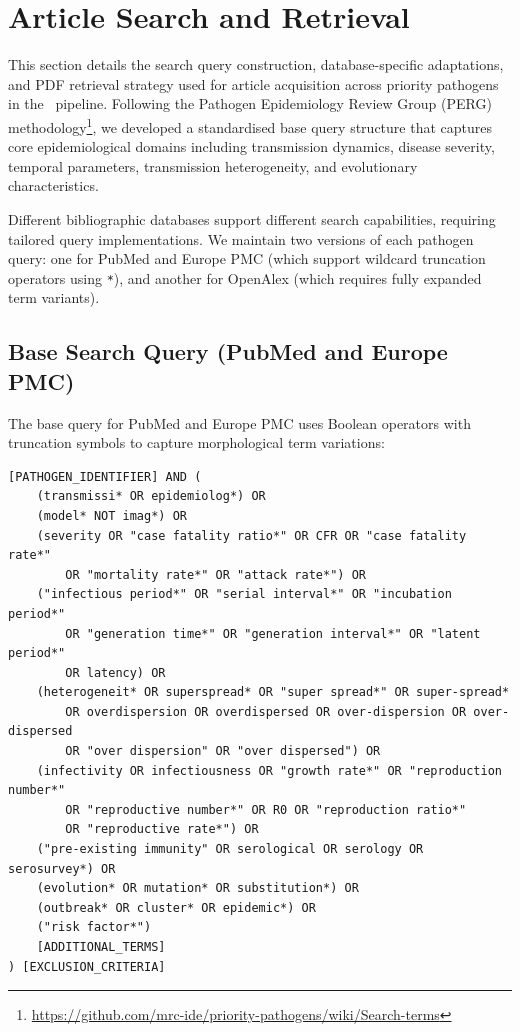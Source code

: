 \section{Article Search and Retrieval}\label{app:search_queries}

This section details the search query construction, database-specific adaptations, and PDF retrieval strategy used for article acquisition across priority pathogens in the \name~pipeline. Following the Pathogen Epidemiology Review Group (PERG) methodology\footnote{\url{https://github.com/mrc-ide/priority-pathogens/wiki/Search-terms}}, we developed a standardised base query structure that captures core epidemiological domains including transmission dynamics, disease severity, temporal parameters, transmission heterogeneity, and evolutionary characteristics.

Different bibliographic databases support different search capabilities, requiring tailored query implementations. We maintain two versions of each pathogen query: one for PubMed and Europe PMC (which support wildcard truncation operators using \texttt{*}), and another for OpenAlex (which requires fully expanded term variants).

\subsection{Base Search Query (PubMed and Europe PMC)}

The base query for PubMed and Europe PMC uses Boolean operators with truncation symbols to capture morphological term variations:

\begin{lstlisting}[basicstyle=\small\ttfamily, breaklines=true, backgroundcolor=\color{gray!10}]
[PATHOGEN_IDENTIFIER] AND (
    (transmissi* OR epidemiolog*) OR 
    (model* NOT imag*) OR 
    (severity OR "case fatality ratio*" OR CFR OR "case fatality rate*" 
        OR "mortality rate*" OR "attack rate*") OR 
    ("infectious period*" OR "serial interval*" OR "incubation period*" 
        OR "generation time*" OR "generation interval*" OR "latent period*" 
        OR latency) OR 
    (heterogeneit* OR superspread* OR "super spread*" OR super-spread* 
        OR overdispersion OR overdispersed OR over-dispersion OR over-dispersed 
        OR "over dispersion" OR "over dispersed") OR 
    (infectivity OR infectiousness OR "growth rate*" OR "reproduction number*" 
        OR "reproductive number*" OR R0 OR "reproduction ratio*" 
        OR "reproductive rate*") OR 
    ("pre-existing immunity" OR serological OR serology OR serosurvey*) OR 
    (evolution* OR mutation* OR substitution*) OR 
    (outbreak* OR cluster* OR epidemic*) OR 
    ("risk factor*")
    [ADDITIONAL_TERMS]
) [EXCLUSION_CRITERIA]
\end{lstlisting}

